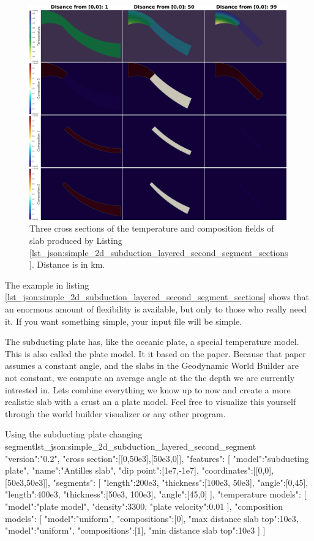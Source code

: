 \documentclass{book}
\newcommand{\GWB}{{Geodynamic World Builder}}
\begin{document}
\begin{figure}
    \centering
    \includegraphics[width=0.99\textwidth]{manual_subduction_section_segments_dist_all_v3_small.png}
    \caption{Three cross sections of the temperature and composition fields of slab produced by Listing \ref{lst_json:simple_2d_subduction_layered_second_segment_sections}. Distance is in km.}
    \label{fig:simple_2d_subduction_3}
\end{figure}

The example in listing \ref{lst_json:simple_2d_subduction_layered_second_segment_sections} shows that an enormous amount of flexibility is available, but only to those who really need it. If you want something simple, your input file will be simple.

The subducting plate has, like the oceanic plate, a special temperature model. This is also called the plate model. It it based on the \cite{mckenzie1970} paper. Because that paper assumes a constant angle, and the slabs in the \GWB{} are not constant, we compute an average angle at the the depth we are currently intrested in. Lets combine everything we know up to now and create a more realistic slab with a crust an a plate model. Feel free to visualize this yourself through the world builder visualizer or any other program.

\begin{javascriptcode}{Using the subducting plate changing segment}{lst_json:simple_2d_subduction_layered_second_segment}
{
  "version":"0.2",
  "cross section":[[0,50e3],[50e3,0]],
  "features":
  [
     {
       "model":"subducting plate", "name":"Antilles slab", "dip point":[1e7,-1e7],
       "coordinates":[[0,0],[50e3,50e3]], 
     "segments":
     [
         {"length":200e3, "thickness":[100e3, 50e3], "angle":[0,45]},
         {"length":400e3, "thickness":[50e3, 100e3], "angle":[45,0]}
     ],
     "temperature models":
     [
       {"model":"plate model", "density":3300, "plate velocity":0.01}
     ],
     "composition models":
     [
       {"model":"uniform", "compositions":[0], "max distance slab top":10e3},
       {"model":"uniform", "compositions":[1], "min distance slab top":10e3}
     ]
    }
  ]
}
\end{javascriptcode}
\end{document}
